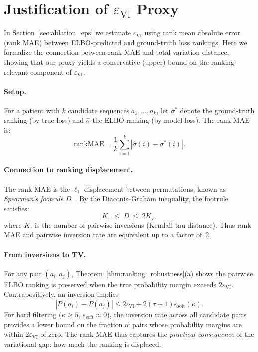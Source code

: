 \documentclass{article}
\newcommand{\ba}{\bar{a}}
\begin{document}
\section{Justification of $\varepsilon_{\mathrm{VI}}$ Proxy}
\label{app:eps_proxy}

In Section~\ref{sec:ablation_eps} we estimate $\varepsilon_{\mathrm{VI}}$ using rank mean absolute error (rank MAE) between ELBO-predicted and ground-truth loss rankings. Here we formalize the connection between rank MAE and total variation distance, showing that our proxy yields a conservative (upper) bound on the ranking-relevant component of $\varepsilon_{\mathrm{VI}}$.

\paragraph{Setup.} For a patient with $k$ candidate sequences $\ba_1, \ldots, \ba_k$, let $\sigma^*$ denote the ground-truth ranking (by true loss) and $\hat{\sigma}$ the ELBO ranking (by model loss). The rank MAE is:
\[
\mathrm{rankMAE} = \frac{1}{k} \sum_{i=1}^{k} |\hat{\sigma}(i) - \sigma^*(i)|.
\]

\paragraph{Connection to ranking displacement.} The rank MAE is the $\ell_1$ displacement between permutations, known as \emph{Spearman's footrule} $D$~\citep{diaconis1977spearman}. By the Diaconis--Graham inequality, the footrule satisfies:
\begin{equation}
\label{eq:dg_inequality}
K_\tau \;\leq\; D \;\leq\; 2K_\tau,
\end{equation}
where $K_\tau$ is the number of pairwise inversions (Kendall tau distance). Thus rank MAE and pairwise inversion rate are equivalent up to a factor of~2.

\paragraph{From inversions to TV.} For any pair $(\ba_i, \ba_j)$, Theorem~\ref{thm:ranking_robustness}(a) shows the pairwise ELBO ranking is preserved when the true probability margin exceeds $2\varepsilon_{\mathrm{VI}}$. Contrapositively, an inversion implies
\[
|P(\ba_i) - P(\ba_j)| \leq 2\varepsilon_{\mathrm{VI}} + 2(\tau+1)\varepsilon_{\mathrm{soft}}(\kappa).
\]
For hard filtering ($\kappa \geq 5$, $\varepsilon_{\mathrm{soft}} \approx 0$), the inversion rate across all candidate pairs provides a lower bound on the fraction of pairs whose probability margins are within $2\varepsilon_{\mathrm{VI}}$ of zero. The rank MAE thus captures the \emph{practical consequence} of the variational gap: how much the ranking is displaced.
\end{document}
